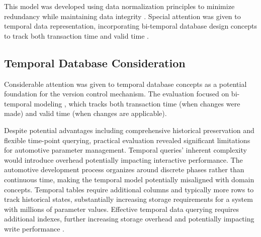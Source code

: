 This model was developed using data normalization principles to minimize redundancy while maintaining data integrity \cite{elmasri2015fundamentals}. Special attention was given to temporal data representation, incorporating bi-temporal database design concepts to track both transaction time and valid time \cite{kulkarni2012temporal}.

\subsection{Temporal Database Consideration}
\label{subsec:temporal-database-consideration}

Considerable attention was given to temporal database concepts as a potential foundation for the version control mechanism. The evaluation focused on bi-temporal modeling \cite{snodgrass1999developing}, which tracks both transaction time (when changes were made) and valid time (when changes are applicable).


Despite potential advantages including comprehensive historical preservation and flexible time-point querying, practical evaluation revealed significant limitations for automotive parameter management. Temporal queries' inherent complexity would introduce overhead potentially impacting interactive performance. The automotive development process organizes around discrete phases rather than continuous time, making the temporal model potentially misaligned with domain concepts. Temporal tables require additional columns and typically more rows to track historical states, substantially increasing storage requirements for a system with millions of parameter values. Effective temporal data querying requires additional indexes, further increasing storage overhead and potentially impacting write performance \cite{bohlen2018database}.

